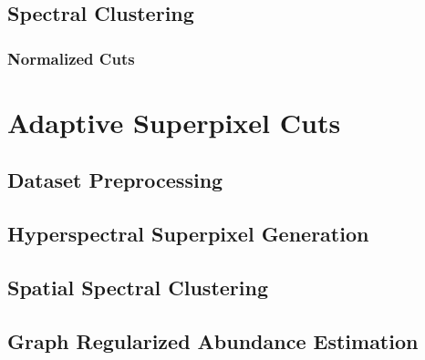 \documentclass[10pt]{article}
\begin{document}
\subsection{Spectral Clustering} \label{Spectral Clustering}

\subsubsection{Normalized Cuts} \label{Normalized Cuts}


\clearpage
% 
% 
% 
% 
% 
\section{Adaptive Superpixel Cuts} \label{Algorithm Intro}


\subsection{Dataset Preprocessing} \label{Algorithm Preprocessing}



% 
\subsection{Hyperspectral Superpixel Generation} \label{Algorithm Superpixels}



\subsection{Spatial Spectral Clustering}\label{Algorithm NCuts}


\subsection{Graph Regularized Abundance Estimation}\label{Algorithm Unmixing}

% 
\end{document}
